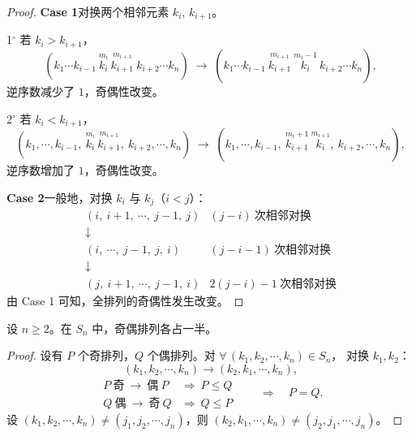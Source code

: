 \begin{proof}
\textbf{Case 1}\quad 对换两个相邻元素 $k_i,\,k_{i+1}$。

1$^\circ$ 若 $k_i>k_{i+1}$，
\[
(k_1\cdots k_{i-1}\ \overset{m_i}{k_i}\ \overset{m_{i+1}}{k_{i+1}}\ k_{i+2}\cdots k_n)
\;\longrightarrow\;
(k_1\cdots k_{i-1}\ \overset{m_{i+1}}{k_{i+1}}\ \overset{m_i-1}{k_i}\ k_{i+2}\cdots k_n),
\]
逆序数减少了 $1$，奇偶性改变。

2$^\circ$ 若 $k_i<k_{i+1}$，
\[
(k_1,\cdots,k_{i-1},\ \overset{m_i}{k_i}\ \overset{m_{i+1}}{k_{i+1}},\ k_{i+2},\cdots,k_n)
\;\longrightarrow\;
(k_1,\cdots,k_{i-1},\ \overset{m_i+1}{k_{i+1}}\ \overset{m_{i+1}}{k_i},\ k_{i+2},\cdots,k_n),
\]
逆序数增加了 $1$，奇偶性改变。

\textbf{Case 2}\quad 一般地，对换 $k_i$ 与 $k_j$（$i<j$）：
\[
\begin{array}{ll}
(i,\ i+1,\ \cdots,\ j-1,\ j) & (j-i)\ \text{次相邻对换}\\[4pt]
\downarrow\\[4pt]
(i,\ \cdots,\ j-1,\ j,\ i) & (j-i-1)\ \text{次相邻对换}\\[4pt]
\downarrow\\[4pt]
(j,\ i+1,\ \cdots,\ j-1,\ i) & 2(j-i)-1\ \text{次相邻对换}
\end{array}
\]
由 Case 1 可知，全排列的奇偶性发生改变。
\end{proof}

\begin{lemma}
设 $n\ge 2$。在 $S_n$ 中，奇偶排列各占一半。
\end{lemma}

\begin{proof}
设有 $P$ 个奇排列，$Q$ 个偶排列。对 $\forall\,(k_1,k_2,\cdots,k_n)\in S_n$，
对换 $k_1,k_2$：
\[
(k_1,k_2,\cdots,k_n)\longrightarrow(k_2,k_1,\cdots,k_n),
\]
\[
\begin{array}{ll}
P\ \text{奇}\ \longrightarrow\ \text{偶}\ P &\Rightarrow\ P\le Q\\[4pt]
Q\ \text{偶}\ \longrightarrow\ \text{奇}\ Q &\Rightarrow\ Q\le P
\end{array}
\qquad\Rightarrow\quad P=Q .
\]
设 $(k_1,k_2,\cdots,k_n)\ne(j_1,j_2,\cdots,j_n)$，则 $(k_2,k_1,\cdots,k_n)\ne(j_2,j_1,\cdots,j_n)$。
\end{proof}
